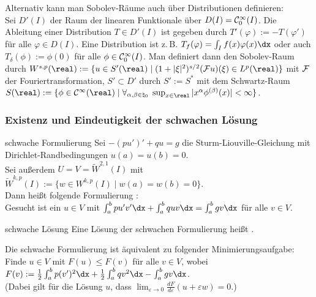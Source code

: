 \begin{Bem}
    Alternativ kann man Sobolev-Räume auch über Distributionen definieren:\\
    Sei $D'(I)$ der Raum der linearen Funktionale über $D(I) = \mathcal{C}_0^\infty(I)$.
    Die Ableitung einer Distribution $T \in D'(I)$ ist gegeben durch
    $T'(\varphi) := -T(\varphi')$ für alle $\varphi \in D(I)$.
    Eine Distribution ist z.\,B. $T_f(\varphi) = \int_I f(x)\varphi(x)\dx$
    oder auch $T_\delta(\phi) := \phi(0)$ für alle $\phi \in \mathcal{C}_0^\infty(I)$.
    Man definiert dann den Sobolev-Raum durch
    $W^{s,p}(\real) := \{u \in S'(\real) \;|\;
    (1 + |\xi|^2)^{s/2} (\F u)(\xi) \in L^p(\real)\}$
    mit $\mathcal{F}$ der Fouriertransformation, $S' \subset D'$ durch
    $S' := S^\ast$ mit dem Schwartz-Raum\\
    $S(\real) := \{\phi \in \C^\infty(\real) \;|\;
    \forall_{\alpha, \beta \in \natural_0}\;
    \sup_{x \in \real} |x^\alpha \phi^{(\beta)}(x)| < \infty\}$.
\end{Bem}

\pagebreak

\subsubsection{%
    Existenz und Eindeutigkeit der schwachen Lösung%
}


\begin{Def}{schwache Formulierung}
    Sei $-(pu')' + qu = g$ die Sturm-Liouville-Gleichung mit
    Dirichlet-Randbedingungen
    $u(a) = u(b) = 0$.\\
    Sei außerdem $U = V = \widetilde{W}^{2,1}(I)$ mit
    $\widetilde{W}^{k,p}(I) := \{w \in W^{k,p}(I) \;|\; w(a) = w(b) = 0\}$.\\
    Dann heißt folgende Formulierung :\\
    Gesucht ist ein $u \in V$ mit
    $\int_a^b pu'v'\dx + \int_a^b quv\dx = \int_a^b gv\dx$ für alle $v \in V$.
\end{Def}

\begin{Def}{schwache Lösung}
    Eine Lösung der schwachen Formulierung heißt .
\end{Def}

\begin{Bem}
    Die schwache Formulierung ist äquivalent zu folgender Minimierungsaufgabe:
    Finde $u \in V$ mit $F(u) \le F(v)$ für alle $v \in V$, wobei
    $F(v) := \frac{1}{2} \int_a^b p(v')^2 \dx + \frac{1}{2} \int_a^b q v^2 \dx -
    \int_a^b g v \dx$.\\
    (Dabei gilt für die Lösung $u$, dass
    $\lim_{\varepsilon \to 0} \frac{dF}{d\varepsilon}(u + \varepsilon w) = 0$.)
\end{Bem}

